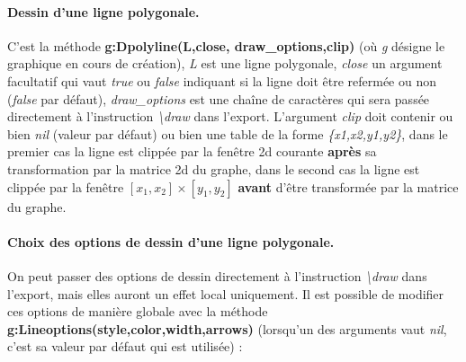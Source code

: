 \paragraph{Dessin d'une ligne polygonale.}

C'est la méthode \textbf{g:Dpolyline(L,close, draw\_options,clip)} (où \emph{g} désigne le graphique en cours de création), \emph{L} est une ligne polygonale, \emph{close} un argument facultatif qui vaut \emph{true} ou \emph{false} indiquant si la ligne doit être refermée ou non (\emph{false} par défaut), \emph{draw\_options} est une chaîne de caractères qui sera passée directement à l'instruction \emph{\textbackslash draw} dans l'export. L'argument \emph{clip} doit contenir ou bien \emph{nil} (valeur par défaut) ou bien une table de la forme \emph{\{x1,x2,y1,y2\}},  dans le premier cas la ligne est clippée par la fenêtre 2d courante \textbf{après} sa transformation par la matrice 2d du graphe, dans le second cas la ligne est clippée par la fenêtre $[x_1,x_2]\times[y_1,y_2]$ \textbf{avant} d'être transformée par la matrice du graphe.

\paragraph{Choix des options de dessin d'une ligne polygonale.}

On peut passer des options de dessin directement à l'instruction \emph{\textbackslash draw} dans l'export, mais elles auront un effet local uniquement. Il est possible de modifier ces options de manière globale avec la méthode \textbf{g:Lineoptions(style,color,width,arrows)} (lorsqu'un des arguments vaut \emph{nil}, c'est sa valeur par défaut qui est utilisée) :


